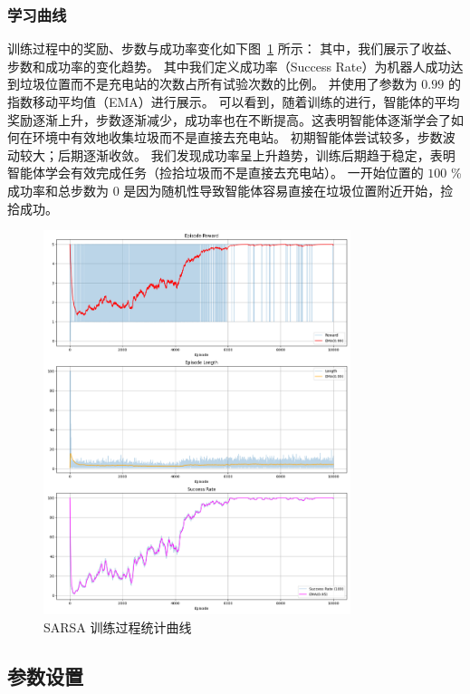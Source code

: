 \subsubsection{学习曲线}

训练过程中的奖励、步数与成功率变化如下图~\ref{fig:sarsa_training} 所示：
其中，我们展示了收益、步数和成功率的变化趋势。
其中我们定义成功率（Success Rate）为机器人成功达到垃圾位置而不是充电站的次数占所有试验次数的比例。
并使用了参数为 \(0.99\) 的指数移动平均值（EMA）进行展示。
可以看到，随着训练的进行，智能体的平均奖励逐渐上升，步数逐渐减少，成功率也在不断提高。这表明智能体逐渐学会了如何在环境中有效地收集垃圾而不是直接去充电站。
初期智能体尝试较多，步数波动较大；后期逐渐收敛。
我们发现成功率呈上升趋势，训练后期趋于稳定，表明智能体学会有效完成任务（捡拾垃圾而不是直接去充电站）。
一开始位置的 \(100\) \% 成功率和总步数为 \(0\) 是因为随机性导致智能体容易直接在垃圾位置附近开始，捡拾成功。

\begin{figure}[htbp] 
    \centering 
    \includegraphics[width=0.8\textwidth]{figure/sweep_robot/sarsa/training_results.png} 
    \caption{SARSA 训练过程统计曲线}\label{fig:sarsa_training} 
\end{figure}

\subsection{参数设置}

